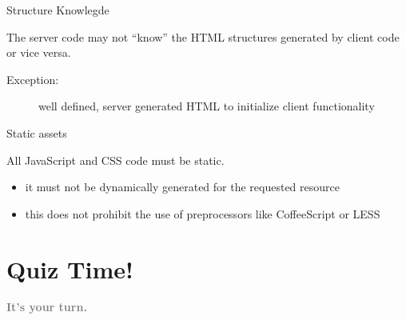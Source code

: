 \documentclass{beamer}
\begin{document}
\begin{frame}{Structure Knowlegde}

  The server code may not ``know'' the HTML structures generated by client code or vice versa.

  \begin{description}
    \item[Exception:] well defined, server generated HTML to initialize client functionality
  \end{description}
\end{frame}

\begin{frame}{Static assets}

  All JavaScript and CSS code must be static.

  \begin{itemize}
    \item it must not be dynamically generated for the requested resource
    \item this does not prohibit the use of preprocessors like CoffeeScript or LESS
  \end{itemize}
\end{frame}

\section{Quiz Time!}

\begin{frame}
  \vspace*{-1cm}
  \textcolor{gray}{
    \begin{center}
      \textbf{
        \fontsize{50}{50}\selectfont It's your turn.
      }
    \end{center}
  }
\end{frame}
\end{document}

